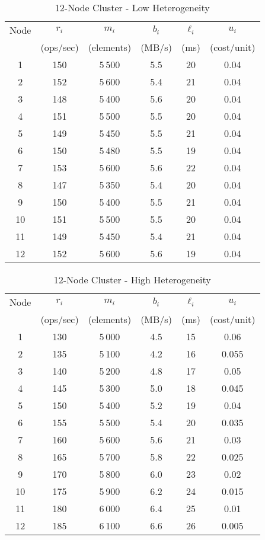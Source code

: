 \documentclass[]{interact}
\theoremstyle{plain}
\theoremstyle{definition}
\theoremstyle{remark}
\begin{document}
\begin{table}[H]
  \centering
  \caption{12-Node Cluster - Low Heterogeneity}
  \label{tab:env12low}
  \begin{tabular}{c|ccccc}
    \toprule
    Node & $r_i$ & $m_i$ & $b_i$ & $\ell_i$ & $u_i$ \\
         & (ops/sec) & (elements) & (MB/s) & (ms) & (cost/unit) \\
    \midrule
     1 & 150 & 5\,500 & 5.5 & 20 & 0.04 \\
     2 & 152 & 5\,600 & 5.4 & 21 & 0.04 \\
     3 & 148 & 5\,400 & 5.6 & 20 & 0.04 \\
     4 & 151 & 5\,500 & 5.5 & 20 & 0.04 \\
     5 & 149 & 5\,450 & 5.5 & 21 & 0.04 \\
     6 & 150 & 5\,480 & 5.5 & 19 & 0.04 \\
     7 & 153 & 5\,600 & 5.6 & 22 & 0.04 \\
     8 & 147 & 5\,350 & 5.4 & 20 & 0.04 \\
     9 & 150 & 5\,400 & 5.5 & 21 & 0.04 \\
    10 & 151 & 5\,500 & 5.5 & 20 & 0.04 \\
    11 & 149 & 5\,450 & 5.4 & 21 & 0.04 \\
    12 & 152 & 5\,600 & 5.6 & 19 & 0.04 \\
    \bottomrule
  \end{tabular}
\end{table}

\begin{table}[H]
  \centering
  \caption{12-Node Cluster - High Heterogeneity}
  \label{tab:env12high}
  \begin{tabular}{c|ccccc}
    \toprule
    Node & $r_i$ & $m_i$ & $b_i$ & $\ell_i$ & $u_i$ \\
         & (ops/sec) & (elements) & (MB/s) & (ms) & (cost/unit) \\
    \midrule
     1 & 130 & 5\,000 & 4.5 & 15 & 0.06 \\
     2 & 135 & 5\,100 & 4.2 & 16 & 0.055 \\
     3 & 140 & 5\,200 & 4.8 & 17 & 0.05 \\
     4 & 145 & 5\,300 & 5.0 & 18 & 0.045 \\
     5 & 150 & 5\,400 & 5.2 & 19 & 0.04 \\
     6 & 155 & 5\,500 & 5.4 & 20 & 0.035 \\
     7 & 160 & 5\,600 & 5.6 & 21 & 0.03 \\
     8 & 165 & 5\,700 & 5.8 & 22 & 0.025 \\
     9 & 170 & 5\,800 & 6.0 & 23 & 0.02 \\
    10 & 175 & 5\,900 & 6.2 & 24 & 0.015 \\
    11 & 180 & 6\,000 & 6.4 & 25 & 0.01 \\
    12 & 185 & 6\,100 & 6.6 & 26 & 0.005 \\
    \bottomrule
  \end{tabular}
\end{table}
\end{document}

